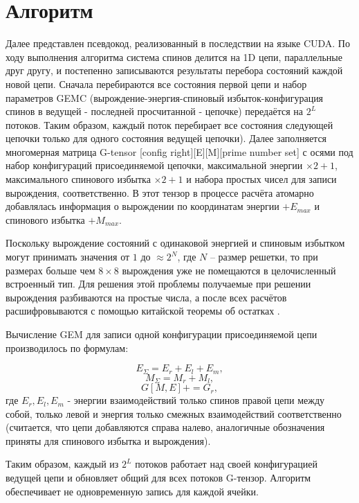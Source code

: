 \documentclass[utf8, babel, sor, jor, amsmath, amssymb, reprint]{elsarticle} %
\begin{document}
	\section{Алгоритм}
	Далее представлен псевдокод, реализованный в последствии на языке CUDA. По ходу выполнения алгоритма система спинов делится на 1D цепи, параллельные друг другу, и постепенно записываются результаты перебора состояний каждой новой цепи. Сначала перебираются все состояния первой цепи и набор параметров GEMC (вырождение-энергия-спиновый избыток-конфигурация спинов в ведущей - последней просчитанной - цепочке) передаётся на $2^L$ потоков. Таким образом, каждый поток перебирает все состояния следующей цепочки только для одного состояния ведущей цепочки). Далее заполняется многомерная матрица G-tensor [config right][E][M][prime number set] с осями под набор конфигураций присоединяемой цепочки, максимальной энергии $\times 2 + 1$, максимального спинового избытка $\times 2 + 1$ и набора простых чисел для записи вырождения, соответственно. В этот тензор в процессе расчёта атомарно добавлялась информация о вырождении по координатам энергии $+ E_{max}$ и спинового избытка $+ M_{max}$.

	Поскольку вырождение состояний с одинаковой энергией и спиновым избытком могут принимать значения от $1$ до $\approx 2^{N}$, где $N$ -- размер решетки, то при размерах больше чем $8 \times 8$ вырождения уже не помещаются в целочисленный встроенный тип. Для решения этой проблемы получаемые при решении вырождения разбиваются на простые числа, а после всех расчётов расшифровываются с помощью китайской теоремы об остатках \cite{katz2007mathematics}.

	Вычисление GEM для записи одной конфигурации присоединяемой цепи производилось по формулам:

	\begin{equation*}
		E_\Sigma = E_r + E_l + E_m,
	\end{equation*}
	\begin{equation*}
		M_\Sigma = M_r + M_l,
	\end{equation*}
	\begin{equation*}
		G[M, E] += G_r,
	\end{equation*}
	где $E_r, E_l, E_m$ - энергии взаимодействий только спинов правой цепи между собой, только левой и энергия только смежных взаимодействий соответственно (считается, что цепи добавляются справа налево, аналогичные обозначения приняты для спинового избытка и вырождения).

	Таким образом, каждый из $2^L$ потоков работает над своей конфигурацией ведущей цепи и обновляет общий для всех потоков G-тензор. Алгоритм обеспечивает не одновременную запись для каждой ячейки. 
\end{document}
